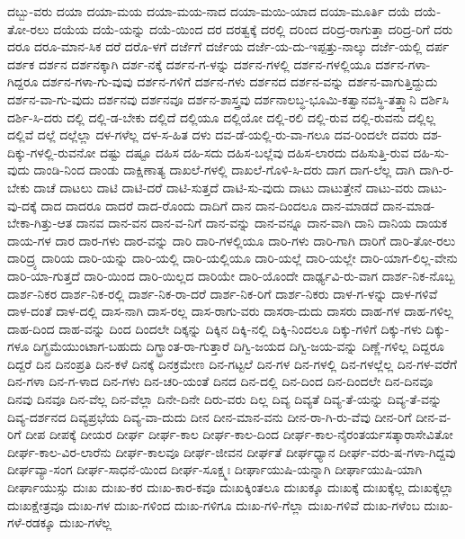 {ದಬ್ಬು-ವರು
ದಯಾ
ದಯಾ-ಮಯ
ದಯಾ-ಮಯ-ನಾದ
ದಯಾ-ಮಯಿ-ಯಾದ
ದಯಾ-ಮೂರ್ತಿ
ದಯೆ
ದಯೆ-ತೋ-ರಲು
ದಯೆಯ
ದಯೆ-ಯನ್ನು
ದಯೆ-ಯಿಂದ
ದರ
ದರತ್ವಕ್ಕೆ
ದರಲ್ಲಿ
ದರಿಂದ
ದರಿದ್ರ-ರಾಗುತ್ತಾ
ದರಿದ್ರ-ರಿಗೆ
ದರು
ದರೂ
ದರೂ-ಮಾನ-ಸಿಕ
ದರೆ
ದರೊ-ಳಗೆ
ದರ್ಜೆಗೆ
ದರ್ಜೆಯ
ದರ್ಜೆ-ಯ-ದು-ಇಪ್ಪತ್ತು-ನಾಲ್ಕು
ದರ್ಜೆ-ಯಲ್ಲಿ
ದರ್ಪ
ದರ್ಶಕ
ದರ್ಶನ
ದರ್ಶನಕ್ಕಾಗಿ
ದರ್ಶ-ನಕ್ಕೆ
ದರ್ಶನ-ಗ-ಳನ್ನು
ದರ್ಶನ-ಗಳಲ್ಲಿ
ದರ್ಶನ-ಗಳಲ್ಲಿಯೂ
ದರ್ಶನ-ಗಳಾ-ಗಿದ್ದರೂ
ದರ್ಶನ-ಗಳಾ-ಗು-ವುವು
ದರ್ಶನ-ಗಳಿಗೆ
ದರ್ಶನ-ಗಳು
ದರ್ಶನದ
ದರ್ಶನ-ವನ್ನು
ದರ್ಶನ-ವಾಗುತ್ತಿದ್ದುದು
ದರ್ಶನ-ವಾ-ಗು-ವುದು
ದರ್ಶನವು
ದರ್ಶನವೂ
ದರ್ಶನ-ಶಾಸ್ತ್ರವು
ದರ್ಶನಾಲಬ್ಧ-ಭೂಮಿ-ಕತ್ವಾನವಸ್ಥಿ-ತತ್ತ್ವಾನಿ
ದರ್ಶಿಸಿ
ದರ್ಶಿ-ಸಿ-ದರು
ದಲ್ಲಿ
ದಲ್ಲಿ-ಡ-ಬೇಕು
ದಲ್ಲಿದೆ
ದಲ್ಲಿಯೂ
ದಲ್ಲಿಯೋ
ದಲ್ಲಿ-ರಲಿ
ದಲ್ಲಿ-ರುವ
ದಲ್ಲಿ-ರುವನು
ದಲ್ಲಿಲ್ಲ
ದಲ್ಲಿವೆ
ದಲ್ಲೆ
ದಲ್ಲೆಲ್ಲಾ
ದಳ-ಗಳೆಲ್ಲ
ದಳ-ಸ-ಹಿತ
ದಳು
ದವ-ಡೆ-ಯಲ್ಲಿ-ರು-ವಾ-ಗಲೂ
ದವ-ರಿಂದಲೇ
ದವರು
ದಶ-ದಿಕ್ಕು-ಗಳಲ್ಲಿ-ರುವನೋ
ದಷ್ಟು
ದಷ್ಟೂ
ದಹಿಸ
ದಹಿ-ಸದು
ದಹಿಸ-ಬಲ್ಲೆವು
ದಹಿಸ-ಲಾರದು
ದಹಿಸುತ್ತಿ-ರುವ
ದಹಿ-ಸು-ವುದು
ದಾಂಡಿ-ನಿಂದ
ದಾಂಡು
ದಾಕ್ಷಿಣಾತ್ಯ
ದಾಖಲೆ-ಗಳಲ್ಲಿ
ದಾಖಲೆ-ಗೊಳಿ-ಸಿ-ದರು
ದಾಗ
ದಾಗ-ಲೆಲ್ಲ
ದಾಗಿ
ದಾಗಿ-ರ-ಬೇಕು
ದಾಚೆ
ದಾಟಲು
ದಾಟಿ
ದಾಟಿ-ದರೆ
ದಾಟಿ-ಸುತ್ತದೆ
ದಾಟಿ-ಸು-ವುದು
ದಾಟು
ದಾಟುತ್ತೇನೆ
ದಾಟು-ವರು
ದಾಟು-ವು-ದಕ್ಕೆ
ದಾದ
ದಾದರೂ
ದಾದರೆ
ದಾದ-ರೊಂದು
ದಾದಿಗೆ
ದಾನ
ದಾನ-ದಿಂದಲೂ
ದಾನ-ಮಾಡದೆ
ದಾನ-ಮಾಡ-ಬೇಕಾ-ಗಿತ್ತು-ಆತ
ದಾನವ
ದಾನ-ವನ
ದಾನ-ವ-ನಿಗೆ
ದಾನ-ವನ್ನು
ದಾನ-ವನ್ನೂ
ದಾನ-ವಾಗಿ
ದಾನಿ
ದಾನಿಯ
ದಾಯಕ
ದಾಯ-ಗಳ
ದಾರ
ದಾರ-ಗಳು
ದಾರ-ವನ್ನು
ದಾರಿ
ದಾರಿ-ಗಳಲ್ಲಿಯೂ
ದಾರಿ-ಗಳು
ದಾರಿ-ಗಾಗಿ
ದಾರಿಗೆ
ದಾರಿ-ತೋ-ರಲು
ದಾರಿದ್ರ್ಯ
ದಾರಿಯ
ದಾರಿ-ಯನ್ನು
ದಾರಿ-ಯಲ್ಲಿ
ದಾರಿ-ಯಲ್ಲಿಯೂ
ದಾರಿ-ಯಲ್ಲೆ
ದಾರಿ-ಯಲ್ಲೇ
ದಾರಿ-ಯಾಗ-ಲಿಲ್ಲ-ವೇನು
ದಾರಿ-ಯಾ-ಗುತ್ತದೆ
ದಾರಿ-ಯಿಂದ
ದಾರಿ-ಯಿಲ್ಲದ
ದಾರಿಯೇ
ದಾರಿ-ಯೊಂದೇ
ದಾರ್ಢ್ಯವಿ-ರು-ವಾಗ
ದಾರ್ಶ-ನಿಕ-ನೊಬ್ಬ
ದಾರ್ಶ-ನಿಕರ
ದಾರ್ಶ-ನಿಕ-ರಲ್ಲಿ
ದಾರ್ಶ-ನಿಕ-ರಾ-ದರೆ
ದಾರ್ಶ-ನಿಕ-ರಿಗೆ
ದಾರ್ಶ-ನಿಕರು
ದಾಳ-ಗ-ಳನ್ನು
ದಾಳ-ಗಳಿವೆ
ದಾಳ-ದಂತೆ
ದಾಳ-ದಲ್ಲಿ
ದಾಸ-ನಾಗಿ
ದಾಸ-ರಲ್ಲ
ದಾಸ-ರಾಗು-ವರು
ದಾಸರಾ-ದುದು
ದಾಸರು
ದಾಹ-ಗಳ
ದಾಹ-ಗಳಿಲ್ಲ
ದಾಹ-ದಿಂದ
ದಾಹ-ವನ್ನು
ದಿಂದ
ದಿಂದಲೇ
ದಿಕ್ಕನ್ನು
ದಿಕ್ಕಿನ
ದಿಕ್ಕಿ-ನಲ್ಲಿ
ದಿಕ್ಕಿ-ನಿಂದಲೂ
ದಿಕ್ಕು-ಗಳಿಗೆ
ದಿಕ್ಕು-ಗಳು
ದಿಕ್ಕು-ಗಳೂ
ದಿಗ್ಬ್ರಮೆಯುಂಟಾಗ-ಬಹುದು
ದಿಗ್ಭ್ರಾಂತ-ರಾ-ಗುತ್ತಾರೆ
ದಿಗ್ವಿ-ಜಯದ
ದಿಗ್ವಿ-ಜಯ-ವನ್ನು
ದಿಣ್ಣೆ-ಗಳಿಲ್ಲ
ದಿದ್ದರೂ
ದಿದ್ದರೆ
ದಿನ
ದಿನಂಪ್ರತಿ
ದಿನ-ಕಳೆ
ದಿನಕ್ಕೆ
ದಿನಕ್ರಮೇಣ
ದಿನ-ಗಟ್ಟಲೆ
ದಿನ-ಗಳ
ದಿನ-ಗಳಲ್ಲಿ
ದಿನ-ಗಳಲ್ಲೆಲ್ಲ
ದಿನ-ಗಳ-ವರೆಗೆ
ದಿನ-ಗಳಾ
ದಿನ-ಗ-ಳಾದ
ದಿನ-ಗಳು
ದಿನ-ಚರಿ-ಯಂತೆ
ದಿನದ
ದಿನ-ದಲ್ಲಿ
ದಿನ-ದಿಂದ
ದಿನ-ದಿಂದಲೇ
ದಿನ-ದಿನವೂ
ದಿನವು
ದಿನವೂ
ದಿನ-ವೆಲ್ಲ
ದಿನ-ವೆಲ್ಲಾ
ದಿನೇ-ದಿನೇ
ದಿರು-ವರು
ದಿಲ್ಲ
ದಿವ್ಯ
ದಿವ್ಯತೆ
ದಿವ್ಯ-ತೆ-ಯನ್ನು
ದಿವ್ಯ-ತೆ-ವನ್ನು
ದಿವ್ಯ-ದರ್ಶನದ
ದಿವ್ಯಪ್ರಭೆಯ
ದಿವ್ಯ-ವಾ-ದುದು
ದೀನ
ದೀನ-ಮಾನ-ವನು
ದೀನ-ರಾ-ಗಿ-ರು-ವೆವು
ದೀನ-ರಿಗೆ
ದೀನ-ವ-ರಿಗೆ
ದೀಪ
ದೀಪಕ್ಕೆ
ದೀಯರ
ದೀರ್ಘ
ದೀರ್ಘ-ಕಾಲ
ದೀರ್ಘ-ಕಾಲ-ದಿಂದ
ದೀರ್ಘ-ಕಾಲ-ನೈರಂತರ್ಯಸತ್ಕಾರಾಸೇವಿತೋ
ದೀರ್ಘ-ಕಾಲ-ವಿರ-ಲಾರೆನು
ದೀರ್ಘ-ಕಾಲವೂ
ದೀರ್ಘ-ಜೀವನ
ದೀರ್ಘತೆ
ದೀರ್ಘಧ್ಯಾನ
ದೀರ್ಘ-ವರು-ಷ-ಗಳಾ-ಗಿದ್ದವು
ದೀರ್ಘವ್ಯಾ-ಸಂಗ
ದೀರ್ಘ-ಸಾಧನೆ-ಯಿಂದ
ದೀರ್ಘ-ಸೂಕ್ಷ್ಮಃ
ದೀರ್ಘಾಯುಷಿ-ಯನ್ನಾಗಿ
ದೀರ್ಘಾಯುಷಿ-ಯಾಗಿ
ದೀರ್ಘಾಯುಸ್ಸು
ದುಃಖ
ದುಃಖ-ಕರ
ದುಃಖ-ಕಾರ-ಕವೂ
ದುಃಖಕ್ಕಿಂತಲೂ
ದುಃಖಕ್ಕೂ
ದುಃಖಕ್ಕೆ
ದುಃಖಕ್ಕೆಲ್ಲ
ದುಃಖಕ್ಕೆಲ್ಲಾ
ದುಃಖಕ್ಷೇತ್ರವೂ
ದುಃಖ-ಗಳ
ದುಃಖ-ಗಳಿಂದ
ದುಃಖ-ಗಳಿಗೂ
ದುಃಖ-ಗಳಿ-ಗೆಲ್ಲಾ
ದುಃಖ-ಗಳಿವೆ
ದುಃಖ-ಗಳೆಂಬ
ದುಃಖ-ಗಳೆ-ರಡಕ್ಕೂ
ದುಃಖ-ಗಳೆಲ್ಲ
}
